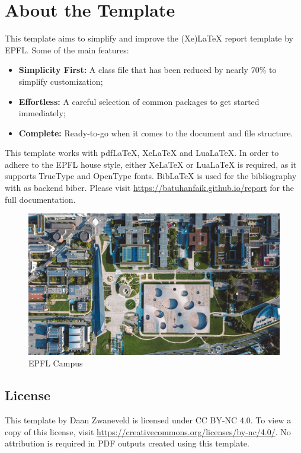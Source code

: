 \chapter{About the Template}

This template aims to simplify and improve the (Xe)LaTeX report template by EPFL. Some of the main features:

\begin{itemize}
  \item \textbf{Simplicity First:} A class file that has been reduced by nearly 70\% to simplify customization;
  \item \textbf{Effortless:} A careful selection of common packages to get started immediately;
  \item \textbf{Complete:} Ready-to-go when it comes to the document and file structure.
\end{itemize}

\noindent This template works with pdfLaTeX, XeLaTeX and LuaLaTeX. In order to adhere to the EPFL house style, either XeLaTeX or LuaLaTeX is required, as it supports TrueType and OpenType fonts. BibLaTeX is used for the bibliography with as backend biber. Please visit \url{https://batuhanfaik.github.io/report} for the full documentation.

\begin{figure}[h]
    \centering
    \includegraphics[width=0.95\linewidth]{figures/campus.jpg}
    \caption{EPFL Campus}
\end{figure}

\section*{License}

This template by Daan Zwaneveld is licensed under CC BY-NC 4.0. To view a copy of this license, visit \url{https://creativecommons.org/licenses/by-nc/4.0/}. No attribution is required in PDF outputs created using this template.
